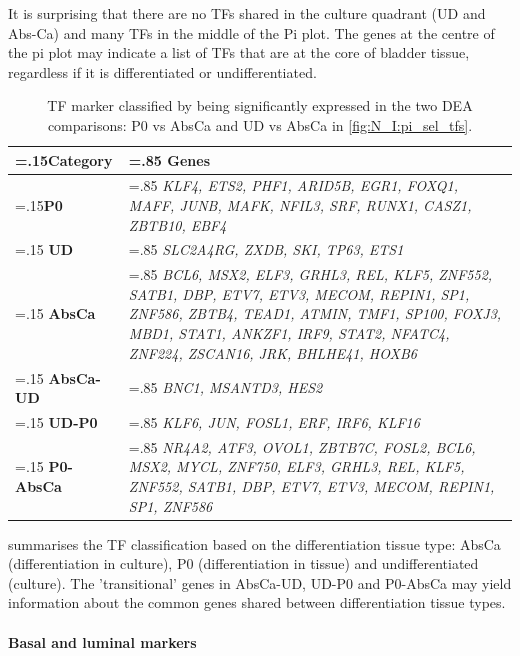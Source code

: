 It is surprising that there are no TFs shared in the culture quadrant (UD and Abs-Ca) and many TFs in the middle of the Pi plot. The genes at the centre of the pi plot may indicate a list of TFs that are at the core of bladder tissue, regardless if it is differentiated or undifferentiated.

\begin{table}[H]
  \centering
  \begin{tabularx}{\textwidth}{>{\hsize=.15\hsize}X|>{\hsize=.85\hsize}X}
    \toprule
    \textbf{Category} & \textbf{Genes} \\
    \midrule
    \textbf{P0} & \textit{KLF4, ETS2, PHF1, ARID5B, EGR1, FOXQ1, MAFF, JUNB, MAFK, NFIL3, SRF, RUNX1, CASZ1, ZBTB10, EBF4} \\
    \midrule
    \textbf{UD} & \textit{SLC2A4RG, ZXDB, SKI, TP63, ETS1} \\
    \midrule
    \textbf{AbsCa} & \textit{BCL6, MSX2, ELF3, GRHL3, REL, KLF5, ZNF552, SATB1, DBP, ETV7, ETV3, MECOM, REPIN1, SP1, ZNF586, ZBTB4, TEAD1, ATMIN, TMF1, SP100, FOXJ3, MBD1, STAT1, ANKZF1, IRF9, STAT2, NFATC4, ZNF224, ZSCAN16, JRK, BHLHE41, HOXB6} \\
    \midrule
    \textbf{AbsCa-UD} & \textit{BNC1, MSANTD3, HES2} \\
    \midrule
    \textbf{UD-P0} & \textit{KLF6, JUN, FOSL1, ERF, IRF6, KLF16} \\
    \midrule
    \textbf{P0-AbsCa} & \textit{NR4A2, ATF3, OVOL1, ZBTB7C, FOSL2, BCL6, MSX2, MYCL, ZNF750, ELF3, GRHL3, REL, KLF5, ZNF552, SATB1, DBP, ETV7, ETV3, MECOM, REPIN1, SP1, ZNF586} \\
    \bottomrule
  \end{tabularx}
  \caption{TF marker classified by being significantly expressed in the two DEA comparisons: P0 vs AbsCa and UD vs AbsCa in \cref{fig:N_I:pi_sel_tfs}.} 
  \label{tab:N_I:markers_diff}
\end{table}

 summarises the TF classification based on the differentiation tissue type: AbsCa (differentiation in culture), P0 (differentiation in tissue) and undifferentiated (culture). The 'transitional' genes in AbsCa-UD, UD-P0 and P0-AbsCa may yield information about the common genes shared between differentiation tissue types.

\paragraph*{Basal and luminal markers}


